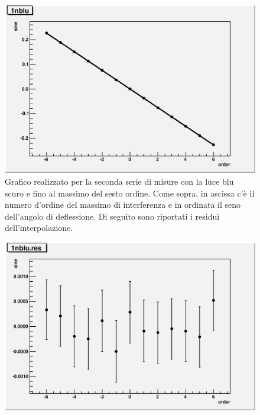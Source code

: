 \documentclass[italian,a4paper]{article}
\begin{document}
\begin{figure}[!h]\centering
\includegraphics[width=\textwidth]{1nblu.eps}
\caption{Grafico realizzato per la seconda serie di misure con la luce blu scuro e fino al massimo del sesto ordine. Come sopra, in ascissa c'è il numero d'ordine del massimo di interferenza e in ordinata il seno dell'angolo di deflessione. Di seguito sono riportati i residui dell'interpolazione.}\label{1nblu}
\end{figure}
\begin{figure}[!h]\centering
\includegraphics[width=\textwidth]{1nblu.res.eps}
\end{figure}
\end{document}
